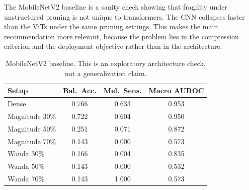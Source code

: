 \documentclass{article}
\begin{document}
The MobileNetV2 baseline is a sanity check showing that fragility under unstructured pruning is not unique to transformers. The CNN collapses faster than the ViTs under the same pruning settings. This makes the main recommendation more relevant, because the problem lies in the compression criterion and the deployment objective rather than in the architecture.

\begin{table}[t]
\centering
\small
\caption{MobileNetV2 baseline. This is an exploratory architecture check, not a generalization claim.}
\label{tab:mobilenet}
\begin{tabular}{lccc}
\toprule
Setup & Bal.\ Acc. & Mel.\ Sens. & Macro AUROC \\
\midrule
Dense      & 0.766 & 0.633 & 0.953 \\
Magnitude 30\% & 0.722 & 0.604 & 0.950 \\
Magnitude 50\% & 0.251 & 0.071 & 0.872 \\
Magnitude 70\% & 0.143 & 0.000 & 0.573 \\
Wanda 30\%     & 0.166 & 0.004 & 0.835 \\
Wanda 50\%     & 0.143 & 0.000 & 0.532 \\
Wanda 70\%     & 0.143 & 1.000 & 0.573 \\
\bottomrule
\end{tabular}
\end{table}

\clearpage


\end{document}
